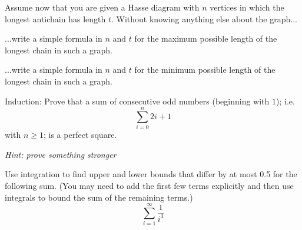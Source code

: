 \documentclass[12pt,oneside]{article}
\begin{document}
\begin{problem}{20}

\eparts

Assume now that you are given a Hasse diagram with $n$ vertices in which the longest antichain has length $t$. Without knowing anything else about the graph...

\bparts
{} ...write a simple formula in $n$ and $t$ for the maximum possible length of the longest chain in such a graph.



 ...write a simple formula in $n$ and $t$ for the minimum possible length of the longest chain in such a graph.

\eparts
\end{problem}

\newpage





\begin{problem}{0}
Induction: Prove that a sum of consecutive odd numbers (beginning with $1$); i.e. $$\sum_{i=0}^{n}2i+1$$ with $n \ge 1$; is a perfect square.

\emph{Hint: prove something stronger}
\end{problem}





\newpage


\begin{problem}{10}
Use integration to find upper and lower bounds that differ by at most
0.5 for the following sum.  (You may need to add the first few terms
explicitly and then use integrals to bound the sum of the remaining
terms.)
%
\[
\sum_{i=1}^{\infty} \frac{1}{i^3}
\]

\end{problem}
\end{document}
